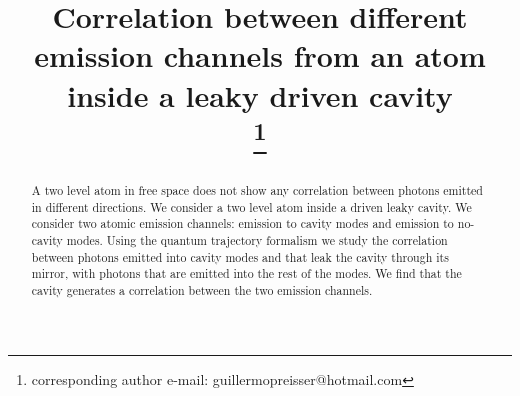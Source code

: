 \documentclass[conference]{IEEEtran}
\begin{document}
\title{Correlation between different emission channels from an atom inside a leaky driven cavity\\
\thanks{corresponding author e-mail: guillermopreisser@hotmail.com}
}

\author{
}

\maketitle

\begin{abstract}
  A two level atom in free space does not show any correlation between
  photons emitted in different directions. We consider a two level
  atom inside a driven leaky cavity. We consider two atomic emission
  channels: emission to cavity modes and emission to no-cavity modes.
  Using the quantum trajectory formalism we study the correlation
  between photons emitted into cavity modes and that leak the cavity
  through its mirror, with photons that are emitted into the rest of
  the modes. We find that the cavity generates a correlation between
  the two emission channels.
\end{abstract}

\end{document}
